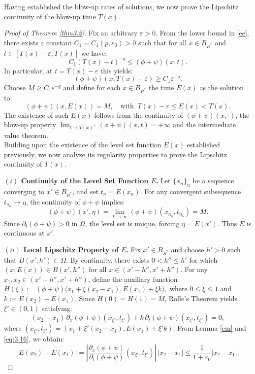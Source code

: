 \documentclass[
  sn-mathphys-num,
  colorlinks,
  linkcolor=darkmagenta,
  citecolor=rufous,
  urlcolor=zaffre,
  hypertexnames=false
]{sn-jnl}
\numberwithin{equation}{section}
\begin{document}
Having established the blow-up rates of solutions, we now prove the Lipschitz continuity of the blow-up time $T(x)$.
\begin{proof}[Proof of Theorem \ref{thm3.2}]
Fix an arbitrary $\varepsilon > 0$. From the lower bound in \eqref{ee}, there exists a constant $C_1 = C_1(p,\varepsilon_0) > 0$ such that for all $x \in B_{R^*}$ and $t \in [T(x)-\varepsilon, T(x)]$ we have:
$$
C_1(T(x)-t)^{-q} \leq (\phi+\psi)(x,t).
$$
In particular, at $t = T(x) - \varepsilon$ this yields:
$$
(\phi+\psi)(x, T(x)-\varepsilon) \geq C_1 \varepsilon^{-q}.
$$
Choose $M \geq C_1 \varepsilon^{-q}$ and define for each $x \in B_{R^*}$ the time $E(x)$ as the solution to:
$$
(\phi+\psi)(x, E(x)) = M, \quad \text{with } \ T(x)-\varepsilon \leq E(x) <  T(x).
$$
The existence of such $E(x)$ follows from the continuity of $(\phi+\psi)(x,\cdot)$, the blow-up property $\lim_{t\to T(x)^-} (\phi+\psi)(x,t) = +\infty$ and the intermediate value theorem.\\
Building upon the existence of the level set function $E(x)$ established previously, we now analyze its regularity properties to prove the Lipschitz continuity of $T(x)$.

\noindent\textbf{$(i)$ Continuity of the Level Set Function $E$.}
Let $\{x_n\}_n$ be a sequence converging to $x' \in B_{R^*}$, and set $t_n = E(x_n)$. For any convergent subsequence $t_{n_k} \to \eta$, the continuity of $\phi + \psi$ implies:
$$
(\phi + \psi)(x', \eta) = \lim_{k \to \infty} (\phi + \psi)(x_{n_k}, t_{n_k}) = M.
$$
Since $\partial_t(\phi + \psi) > 0$ in $\Omega$, the level set is unique, forcing $\eta = E(x')$. Thus $E$ is continuous at $x'$.

\medskip
\noindent\textbf{$(ii)$ Local Lipschitz Property of $E$.}
Fix $x' \in B_{R^*}$ and choose $h'>0$ such that $B(x',h') \subset \Omega$. By continuity, there exists $0<h''\le h'$ for which $(x,E(x))\in B(x',h'')$ for all $x\in (x'-h'',x'+h'')$. For any $x_1,x_2\in (x'-h'',x'+h'')$, define the auxiliary function
\(
H(\xi) := (\phi + \psi)\big(x_1 + \xi(x_2 - x_1), E(x_1) + \xi k\big), 
\) where $0 \leq \xi \leq 1$ and $ k := E(x_2) - E(x_1).$
Since $H(0) = H(1) = M$, Rolle's Theorem yields $\xi' \in (0,1)$ satisfying:
\begin{equation}
\label{eq:3.16}
(x_2 - x_1)\,\partial_x(\phi + \psi)(x_{\xi'}, t_{\xi'}) + k\,\partial_t(\phi + \psi)(x_{\xi'}, t_{\xi'}) = 0,
\end{equation}
where $(x_{\xi'}, t_{\xi'}) = (x_1 + \xi'(x_2 - x_1), E(x_1) + \xi' k)$. From Lemma \ref{em} and \eqref{eq:3.16}, we obtain:
$$
|E(x_2) - E(x_1)| = \left|\frac{\partial_x(\phi + \psi)}{\partial_t(\phi + \psi)}(x_{\xi'}, t_{\xi'})\right|\,|x_2 - x_1| \leq \frac{1}{1 + \varepsilon_0} |x_2 - x_1|.
$$



\end{proof}
\end{document}
